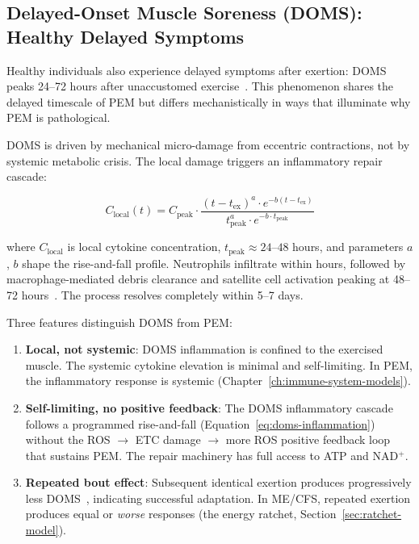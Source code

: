 \subsection{Delayed-Onset Muscle Soreness (DOMS): Healthy Delayed Symptoms}
\label{sec:doms-model}

Healthy individuals also experience delayed symptoms after exertion: DOMS peaks 24--72 hours after unaccustomed exercise~\cite{Clarkson2002DOMS}. This phenomenon shares the delayed timescale of PEM but differs mechanistically in ways that illuminate why PEM is pathological.

DOMS is driven by mechanical micro-damage from eccentric contractions, not by systemic metabolic crisis. The local damage triggers an inflammatory repair cascade:

\begin{equation}
\label{eq:doms-inflammation}
C_{\text{local}}(t) = C_{\text{peak}} \cdot \frac{(t - t_{\text{ex}})^a \cdot e^{-b(t - t_{\text{ex}})}}{t_{\text{peak}}^a \cdot e^{-b \cdot t_{\text{peak}}}}
\end{equation}

where $C_{\text{local}}$ is local cytokine concentration, $t_{\text{peak}} \approx 24$--$48$ hours, and parameters $a$, $b$ shape the rise-and-fall profile. Neutrophils infiltrate within hours, followed by macrophage-mediated debris clearance and satellite cell activation peaking at 48--72 hours~\cite{Peake2017muscle}. The process resolves completely within 5--7 days.

Three features distinguish DOMS from PEM:

\begin{enumerate}
    \item \textbf{Local, not systemic}: DOMS inflammation is confined to the exercised muscle. The systemic cytokine elevation is minimal and self-limiting. In PEM, the inflammatory response is systemic (Chapter~\ref{ch:immune-system-models}).
    \item \textbf{Self-limiting, no positive feedback}: The DOMS inflammatory cascade follows a programmed rise-and-fall (Equation~\ref{eq:doms-inflammation}) without the ROS $\to$ ETC damage $\to$ more ROS positive feedback loop that sustains PEM. The repair machinery has full access to ATP and NAD$^+$.
    \item \textbf{Repeated bout effect}: Subsequent identical exertion produces progressively less DOMS~\cite{Clarkson2002DOMS}, indicating successful adaptation. In ME/CFS, repeated exertion produces equal or \emph{worse} responses (the energy ratchet, Section~\ref{sec:ratchet-model}).
\end{enumerate}

